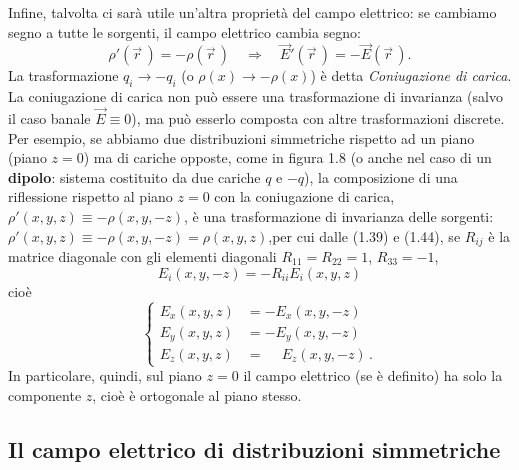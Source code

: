 Infine, talvolta ci sarà utile un'altra proprietà del campo elettrico: se cambiamo segno a tutte le sorgenti, il campo elettrico cambia segno:
\begin{equation}
\rho'(\vec r\,)=-\rho(\vec r\,)\quad\Rightarrow\quad\vec E'(\vec r\,)=-\vec E(\vec r\,).
\tag{1.44}
\end{equation}
La trasformazione $q_i\to-q_i$ (o $\rho(x)\to-\rho(x)$) è detta \emph{Coniugazione di carica}.\\
La coniugazione di carica non può essere una trasformazione di invarianza (salvo il caso banale $\vec E\equiv0$), ma può esserlo composta con altre trasformazioni discrete.\\
Per esempio, se abbiamo due distribuzioni simmetriche rispetto ad un piano (piano $z=0$) ma di cariche opposte, come in figura 1.8 (o anche nel caso di un \textbf{dipolo}: sistema costituito da due cariche $q$ e $-q$), la composizione di una riflessione rispetto al piano $z=0$ con la coniugazione di carica, $\rho'(x,y,z)\equiv-\rho(x,y,-z)$, è una trasformazione di invarianza delle sorgenti:
$\rho'(x,y,z)\equiv-\rho(x,y,-z)=\rho(x,y,z)$,\quad per cui dalle (1.39) e (1.44), se $R_{ij}$ è la matrice diagonale con gli elementi diagonali $R_{11}=R_{22}=1$, $R_{33}=-1$,
\begin{equation}
E_i(x,y,-z)=-R_{ii}E_i(x,y,z)
\tag{1.45}
\end{equation}
cioè
\begin{equation}
\left\{\begin{aligned}
E_x(x,y,z)&=-E_x(x,y,-z)\\
E_y(x,y,z)&=-E_y(x,y,-z)\\
E_z(x,y,z)&=\phantom{-}E_z(x,y,-z)\,.
\end{aligned}\right.
\tag{1.46}
\end{equation}
In particolare, quindi, sul piano $z=0$ il campo elettrico (se è definito) ha solo la componente $z$, cioè è ortogonale al piano stesso.

\subsection{Il campo elettrico di distribuzioni simmetriche}

